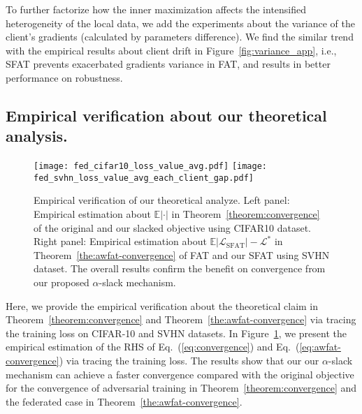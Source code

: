 \documentclass{article} %
\theoremstyle{plain}
\theoremstyle{definition}
\theoremstyle{remark}
\begin{document}
To further factorize how the inner maximization affects the intensified heterogeneity of the local data, we add the experiments about the variance of the client's gradients (calculated by parameters difference). We find the similar trend with the empirical results about client drift in Figure~\ref{fig:variance_app}, i.e., SFAT prevents exacerbated gradients variance in FAT, and results in better performance on robustness. 

\subsection{Empirical verification about our theoretical analysis.}
\label{app:theo_empirical}
\vspace{3mm}
\begin{figure}[ht]
    \centering
    \texttt{[image: fed\_cifar10\_loss\_value\_avg.pdf]}
    \hspace{0.17in}
    \texttt{[image: fed\_svhn\_loss\_value\_avg\_each\_client\_gap.pdf]}
    \caption{Empirical verification of our theoretical analyze. Left panel: Empirical estimation about $\mathbb{E}|\cdot|$ in Theorem~\ref{theorem:convergence} of the original and our slacked objective using CIFAR10 dataset. Right panel: Empirical estimation about  $\mathbb{E}|\mathcal{L}_{\text{SFAT}}|-\mathcal{L}^{*}$ in Theorem~\ref{the:awfat-convergence} of FAT and our SFAT using SVHN dataset. The overall results confirm the benefit on convergence from our proposed $\alpha$-slack mechanism.}
    \label{fig:theo_empirical_app}
\end{figure}
\vspace{3mm}

Here, we provide the empirical verification about the theoretical claim in Theorem~\ref{theorem:convergence} and Theorem~\ref{the:awfat-convergence} via tracing the training loss on CIFAR-10 and SVHN datasets. In Figure~\ref{fig:theo_empirical_app}, we present the empirical estimation of the RHS of Eq.~(\ref{eq:convergence}) and Eq.~(\ref{eq:awfat-convergence}) via tracing the training loss. The results show that our our $\alpha$-slack mechanism can achieve a faster convergence compared with the original objective for the convergence of adversarial training in Theorem~\ref{theorem:convergence} and the federated case in Theorem~\ref{the:awfat-convergence}.
\end{document}
